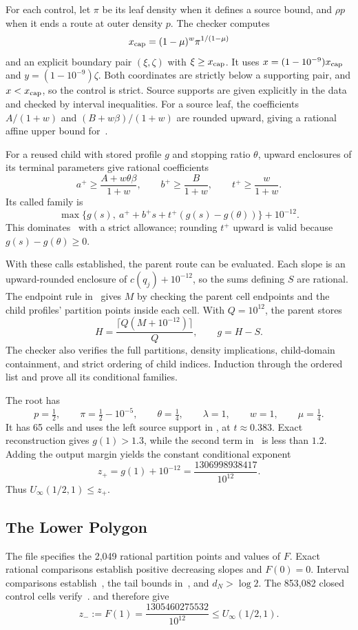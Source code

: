 \documentclass[11pt]{article}
\theoremstyle{definition}
\newcommand{\zp}{\frac{1306998938417}{10^{12}}}
\newcommand{\zm}{\frac{1305460275532}{10^{12}}}
\begin{document}
For each control, let $\pi$ be its leaf density when it defines a source bound, and $\rho p$ when it ends a route at outer density $p$.
The checker computes
\[
 x_{\rm cap}=(1-\mu)^w\pi^{1/(1-\mu)}
\]
and an explicit boundary pair $(\xi,\zeta)$ with $\xi\ge x_{\rm cap}$.
It uses $x=(1-10^{-9})x_{\rm cap}$ and $y=(1-10^{-9})\zeta$.
Both coordinates are strictly below a supporting pair, and $x<x_{\rm cap}$, so the control is strict.
Source supports are given explicitly in the data and checked by interval inequalities.
For a source leaf, the coefficients $A/(1+w)$ and $(B+w\beta)/(1+w)$ are rounded upward, giving a rational affine upper bound for~.

For a reused child with stored profile $g$ and stopping ratio $\theta$, upward enclosures of its terminal parameters give rational coefficients
\[
 a^+\ge\frac{A+w\theta\beta}{1+w},\qquad
 b^+\ge\frac{B}{1+w},\qquad t^+\ge\frac{w}{1+w}.
\]
Its called family is
\[
 \max\{g(s),\ a^++b^+s+t^+(g(s)-g(\theta))\}+10^{-12}.
\]
This dominates~ with a strict allowance; rounding $t^+$ upward is valid because $g(s)-g(\theta)\ge0$.

With these calls established, the parent route can be evaluated.
Each slope is an upward-rounded enclosure of $c(q_j)+10^{-12}$, so the sums defining $S$ are rational.
The endpoint rule in~ gives $M$ by checking the parent cell endpoints and the child profiles' partition points inside each cell.
With $Q=10^{12}$, the parent stores
\[
 H=\frac{\lceil Q(M+10^{-12})\rceil}{Q},\qquad g=H-S.
\]
The checker also verifies the full partitions, density implications, child-domain containment, and strict ordering of child indices.
Induction through the ordered list and  prove all its conditional families.

The root has
\[
 p=\tfrac12,\qquad\pi=\tfrac12-10^{-5},\qquad
 \theta=\tfrac14,\qquad\lambda=1,\qquad w=1,\qquad\mu=\tfrac14.
\]
It has 65 cells and uses the left source support in , at $t\approx0.383$.
Exact reconstruction gives $g(1)>1.3$, while the second term in~ is less than $1.2$.
Adding the output margin yields the constant conditional exponent
\[
 z_+=g(1)+10^{-12}=\zp.
\]
Thus $U_\infty(1/2,1)\le z_+$.

\subsection{The Lower Polygon}
The file  specifies the 2,049 rational partition points and values of $F$.
Exact rational comparisons establish positive decreasing slopes and $F(0)=0$.
Interval comparisons establish~, the tail bounds in~, and $d_N>\log2$.
The 853,082 closed control cells verify~.
 and  therefore give
\[
 z_-:=F(1)=\zm\le U_\infty(1/2,1).
\]
\end{document}

